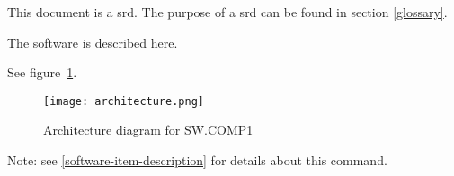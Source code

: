 \documentclass[a4paper]{report}
\begin{document}
    

    \tableofcontents
    \pagebreak

    \listoffigures
    \pagebreak

    \listoftables
    \pagebreak

    \blindtext[1]


    This document is a \acrfull{srd}. The purpose of a \acrshort{srd} can be found in section \ref{glossary}.

    \label{glossary}
    \printglossary[style=clong]
    \printglossary[type=\acronymtype]

    \blindtext[1]

    \blindtext[1]

    \blindtext[1]

    \label{software-item-description}

    The \gls{software} is described here.

    \blindtext[1]

    \blindtext[1]


    See figure~\ref{fig:architecture-diagram}.

    \begin{figure}[H]
    \texttt{[image: architecture.png]}
    \caption{Architecture diagram for SW.COMP1}
    \centering\label{fig:architecture-diagram}
    \end{figure}

    \blindtext[1]





    \blindtext[1]

    

    Note: see \ref{software-item-description} for details about this command.
\end{document}
